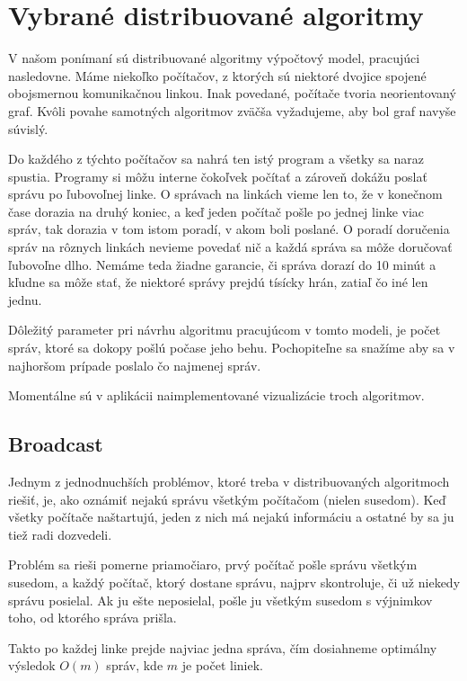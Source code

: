 \section{Vybrané distribuované algoritmy}

V našom ponímaní sú distribuované algoritmy výpočtový model, pracujúci nasledovne.
Máme niekoľko počítačov, z ktorých sú niektoré dvojice spojené obojsmernou komunikačnou linkou.
Inak povedané, počítače tvoria neorientovaný graf. Kvôli povahe samotných algoritmov zväčša vyžadujeme,
aby bol graf navyše súvislý.

Do každého z týchto počítačov sa nahrá ten istý program a všetky sa naraz spustia. Programy si môžu
interne čokoľvek počítať a zároveň dokážu poslať správu po ľubovoľnej linke. O správach na linkách
vieme len to, že v konečnom čase dorazia na druhý koniec, a keď jeden počítač pošle po jednej linke
viac správ, tak dorazia v tom istom poradí, v akom boli poslané. O poradí doručenia správ na rôznych
linkách nevieme povedať nič a každá správa sa môže doručovať ľubovoľne dlho. Nemáme teda žiadne garancie, či
správa dorazí do 10 minút a kľudne sa môže stať, že niektoré správy prejdú tísícky hrán, zatiaľ čo
iné len jednu.

Dôležitý parameter pri návrhu algoritmu pracujúcom v tomto modeli, je počet správ, ktoré sa dokopy
pošlú počase jeho behu. Pochopiteľne sa snažíme aby sa v najhoršom prípade poslalo čo najmenej
správ.

Momentálne sú v aplikácii naimplementované vizualizácie troch algoritmov.

\subsection{Broadcast}

Jednym z jednodnuchších problémov, ktoré treba v distribuovaných algoritmoch riešiť, je, ako 
oznámiť nejakú správu všetkým počítačom (nielen susedom). Keď všetky počítače naštartujú, 
jeden z nich má nejakú informáciu a ostatné by sa ju tiež radi dozvedeli.

Problém sa rieši pomerne priamočiaro, prvý počítač pošle správu všetkým susedom, a každý
počítač, ktorý dostane správu, najprv skontroluje, či už niekedy správu posielal. 
Ak ju ešte neposielal, pošle ju všetkým susedom s výjnimkov toho, od ktorého správa prišla.

Takto po každej linke prejde najviac jedna správa, čím dosiahneme optimálny výsledok $O(m)$ správ,
kde $m$ je počet liniek.

